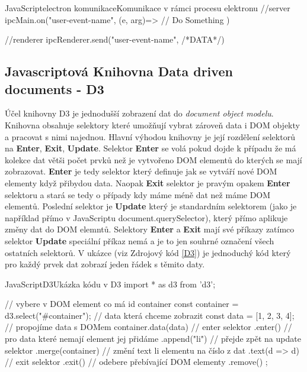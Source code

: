 \documentclass[
  biblatex,
  glossaries,
  index
]{kidiplom}
\begin{document}
\begin{kicode}{JavaScript}{electron komunikace}{Komunikace v rámci procesu elektronu}
  //server
  ipcMain.on("user-event-name", (e, arg)=>{
    // Do Something
  })

  //renderer
  ipcRenderer.send("user-event-name", {/*DATA*/})
\end{kicode}

\subsection{Javascriptová Knihovna Data driven documents - D3}
Účel knihovny D3 je jednodušší zobrazení dat do \textit{document object modelu}.
Knihovna obsahuje selektory které umožňují vybrat zároveň data 
i DOM objekty a pracovat s nimi najednou. Hlavní výhodou knihovny 
je její rozdělení selektorů na \textbf{Enter}, \textbf{Exit}, \textbf{Update}.
Selektor \textbf{Enter} se volá pokud dojde k případu že má kolekce 
dat větši počet prvků než je vytvořeno DOM elementů do kterých se mají zobrazovat.
\textbf{Enter} je tedy selektor který definuje jak se vytváří nové DOM elementy 
když přibydou data. Naopak \textbf{Exit} selektor je pravým opakem \textbf{Enter}
selektoru a stará se tedy o případy kdy máme méně dat než máme DOM elementů.
Poslední selektor je \textbf{Update} který je standardním selektorem 
(jako je například přímo v JavaScriptu document.querySelector), který přímo 
aplikuje změny dat do DOM elemntů. Selektory \textbf{Enter} a \textbf{Exit} 
mají své příkazy zatímco selektor \textbf{Update} speciální příkaz nemá a je to jen 
souhrné označení všech ostatních selektorů. V ukázce (viz Zdrojový kód \ref{D3}) je
jednoduchý kód který pro každý prvek dat zobrazí jeden řádek s těmito daty.

\begin{kicode}{JavaScript}{D3}{Ukázka kódu v D3}
import * as d3 from 'd3';

// vybere v DOM element co má id container
const container = d3.select("#container");
// data která chceme zobrazit 
const data = [1, 2, 3, 4];
// propojíme data s DOMem
container.data(data)
    // enter selektor
    .enter()
    // pro data které nemají element jej přidáme
    .append("li")
    // přejde zpět na update selektor
    .merge(container)
    // změní text li elementu na číslo z dat
    .text(d => d)
    // exit selektor
    .exit()
    // odebere přebívající DOM elementy
    .remove()
    ;
  
\end{kicode}
\end{document}
